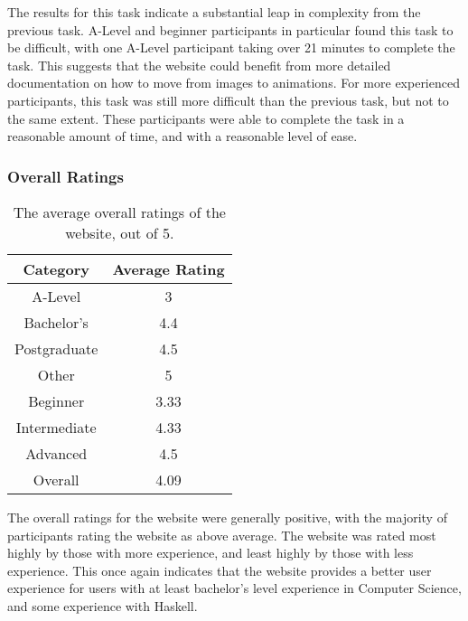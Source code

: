 \documentclass[../main.tex]{subfiles}
\begin{document}
                The results for this task indicate a substantial leap in complexity from the
                    previous task.
                A-Level and beginner participants in particular found this task to be
                    difficult, with one A-Level participant taking over 21 minutes to complete the
                    task.
                This suggests that the website could benefit from more detailed documentation
                    on how to move from images to animations.
                For more experienced participants, this task was still more difficult than the
                    previous task, but not to the same extent.
                These participants were able to complete the task in a reasonable amount of
                    time, and with a reasonable level of ease.

            \subsubsection{Overall Ratings}
                \begin{table}[H]
                    \centering
                    \begin{tabular}{c|c}
                        \textbf{Category} & \textbf{Average Rating} \\
                        \hline
                        A-Level           & 3                       \\
                        Bachelor's        & 4.4                     \\
                        Postgraduate      & 4.5                     \\
                        Other             & 5                       \\
                        \hline
                        Beginner          & 3.33                    \\
                        Intermediate      & 4.33                    \\
                        Advanced          & 4.5                     \\
                        \hline
                        Overall           & 4.09                    \\
                    \end{tabular}
                    \caption{The average overall ratings of the website, out of 5.}
                \end{table}

                The overall ratings for the website were generally positive, with the majority
                    of participants rating the website as above average.
                The website was rated most highly by those with more experience, and least
                    highly by those with less experience.
                This once again indicates that the website provides a better user experience
                    for users with at least bachelor's level experience in Computer Science, and
                    some experience with Haskell.
\end{document}
